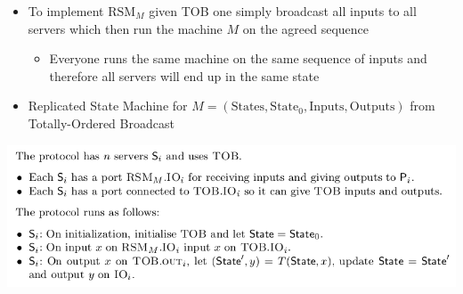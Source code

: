 \documentclass[11pt]{article}
\begin{document}
\begin{itemize}
\item To implement \(\text{RSM}_M\) given TOB one simply broadcast all inputs to all servers which then run the machine \(M\) on the agreed sequence
\begin{itemize}
\item Everyone runs the same machine on the same sequence of inputs and therefore all servers will end up in the same state
\end{itemize}

\item Replicated State Machine for \(M = (\text{States}, \text{State}_0 , \text{Inputs}, \text{Outputs})\) from Totally-Ordered Broadcast
\end{itemize}
\begin{center}
\includegraphics[width=.9\linewidth]{State Machine Replication (10)/screenshot_2018-10-21_09-02-29.png}
\end{center}
\end{document}
